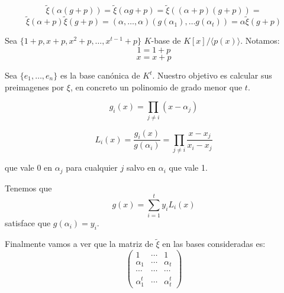 \[
  \tilde{\xi}(\alpha(g+p))=\tilde{\xi}(\alpha g+p)=\tilde{\xi}((\alpha
  + p)(g +p))=\]\[\tilde{\xi}(\alpha + p)\tilde{\xi}(g+p)=
  (\alpha,\ldots, \alpha)(g(\alpha_1),\ldots g(\alpha_t))=
  \alpha\tilde{\xi}(g+p)
\]

Sea \(\{1+p, x+p, x^2+p,\ldots, x^{t-1} +p\}\)
\(K\)-base de \(K[x]/\langle p(x)\rangle\).
Notamos:
\[ 1 = 1+p\]
\[ x = x+p\]

Sea \(\{e_1,\ldots, e_n\}\) es la base canónica de \(K^t\).
Nuestro objetivo es calcular sus preimagenes por \(\xi\), en concreto
un polinomio de grado menor que \(t\).

\[
  g_i(x)=\prod_{j\neq i}(x-\alpha_j)
\]

\[
  L_i(x)=\frac{g_i(x)}{g(\alpha_i)}=\prod_{j\neq i}\frac{x-x_j}{x_i-x_j}
\]

que vale 0 en \(\alpha_j\) para cualquier \(j\)
salvo en \(\alpha_i\) que vale 1.

Tenemos que
\[
  g(x)=\sum_{i=1}^t y_i L_i(x)
\]
satisface que \(g(\alpha_i)=y_i\).


Finalmente vamos a ver que la matriz de \(\tilde{\xi}\) en las bases
consideradas es:
\[
  \begin{pmatrix}
    1&\cdots& 1\\
    \alpha_1 &\cdots&\alpha_t\\
    \cdots&\cdots&\cdots\\
    \alpha_1^t&\cdots&\alpha_t^t
  \end{pmatrix}
\]
